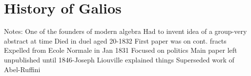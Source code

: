 \documentclass[12pt]{article}
\begin{document}
\section{History of Galios}

Notes:
One of the founders of modern algebra
Had to invent idea of a group-very abstract at time
Died in duel aged 20-1832
First paper was on cont. fracts
Expelled from Ecole Normale in Jan 1831
Focused on politics
Main paper left unpublished until 1846-Joseph Liouville explained things
Superseded work of Abel-Ruffini

\newpage

\end{document}
